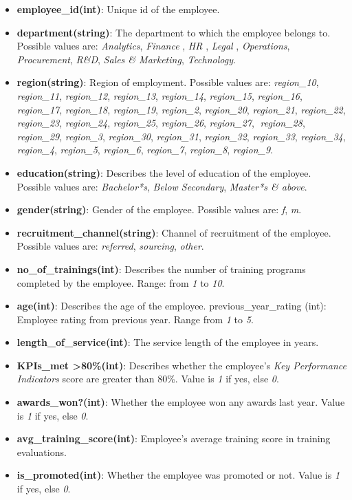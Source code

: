 \documentclass[runningheads]{llncs}
\providecommand{\tightlist}{%
\setlength{\itemsep}{0pt}\setlength{\parskip}{0pt}}
\begin{document}
\begin{itemize}
\tightlist
\item
  \textbf{employee\_id(int)}: Unique id of the employee.
\item
  \textbf{department(string)}: The department to which the employee
  belongs to. Possible values are: \emph{Analytics}, \emph{Finance} ,
  \emph{HR} , \emph{Legal} , \emph{Operations}, \emph{Procurement},
  \emph{R\&D}, \emph{Sales \& Marketing}, \emph{Technology}.
\item
  \textbf{region(string)}: Region of employment. Possible values are:
  \emph{region\_10}, \emph{region\_11}, \emph{region\_12},
  \emph{region\_13}, \emph{region\_14}, \emph{region\_15},
  \emph{region\_16}, \emph{region\_17}, \emph{region\_18},
  \emph{region\_19}, \emph{region\_2}, \emph{region\_20},
  \emph{region\_21}, \emph{region\_22}, \emph{region\_23},
  \emph{region\_24}, \emph{region\_25}, \emph{region\_26},
  \emph{region\_27}, \emph{region\_28}, \emph{region\_29},
  \emph{region\_3}, \emph{region\_30}, \emph{region\_31},
  \emph{region\_32}, \emph{region\_33}, \emph{region\_34},
  \emph{region\_4}, \emph{region\_5}, \emph{region\_6},
  \emph{region\_7}, \emph{region\_8}, \emph{region\_9}.
\item
  \textbf{education(string)}: Describes the level of education of the
  employee. Possible values are: \emph{Bachelor*s}, \emph{Below
  Secondary}, \emph{Master*s \& above}.
\item
  \textbf{gender(string)}: Gender of the employee. Possible values are:
  \emph{f}, \emph{m}.
\item
  \textbf{recruitment\_channel(string)}: Channel of recruitment of the
  employee. Possible values are: \emph{referred}, \emph{sourcing},
  \emph{other}.
\item
  \textbf{no\_of\_trainings(int)}: Describes the number of training
  programs completed by the employee. Range: from \emph{1} to \emph{10}.
\item
  \textbf{age(int)}: Describes the age of the employee.
  previous\_year\_rating (int): Employee rating from previous year.
  Range from \emph{1} to \emph{5}.
\item
  \textbf{length\_of\_service(int)}: The service length of the employee
  in years.
\item
  \textbf{KPIs\_met \textgreater80\%(int)}: Describes whether the
  employee's \emph{Key Performance Indicators} score are greater than
  80\%. Value is \emph{1} if yes, else \emph{0}.
\item
  \textbf{awards\_won?(int)}: Whether the employee won any awards last
  year. Value is \emph{1} if yes, else \emph{0}.
\item
  \textbf{avg\_training\_score(int)}: Employee's average training score
  in training evaluations.
\item
  \textbf{is\_promoted(int)}: Whether the employee was promoted or not.
  Value is \emph{1} if yes, else \emph{0}.
\end{itemize}
\end{document}
